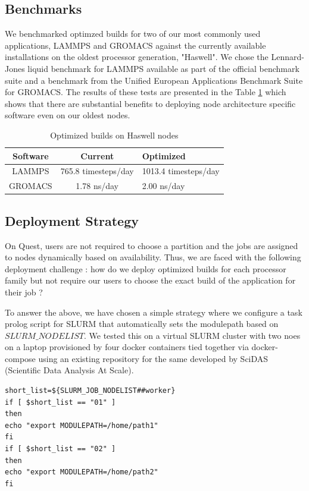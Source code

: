 \documentclass[sigconf,authordraft]{acmart}
\begin{document}
\subsection{Benchmarks}
We benchmarked optimzed builds for two of our most commonly used applications, LAMMPS\cite{lammps} and GROMACS \cite{gromacs_1995,gromacs_2015} against the currently available installations on the oldest processor generation, "Haswell". We chose the Lennard-Jones liquid benchmark for LAMMPS available as part of the official benchmark suite \cite{lammps_bench} and a benchmark from the Unified European Applications Benchmark Suite \cite{ueabs_prace,ueabs_repo} for GROMACS. The results of these tests are presented in the Table \ref{tab:bench_apps} which shows that there are substantial benefits to deploying node architecture specific software even on our oldest nodes.

\begin{table}
	\caption{Optimized builds on Haswell nodes}
	\label{tab:bench_apps}
	\begin{tabular}{ccl}
		\toprule
		Software &Current&Optimized\\
		\midrule
		LAMMPS & 765.8 timesteps/day&1013.4 timesteps/day\\
		GROMACS & 1.78 ns/day&2.00 ns/day\\
		\bottomrule
	\end{tabular}
\end{table}

\subsection{Deployment Strategy}
On Quest, users are not required to choose a partition and the jobs are assigned to nodes dynamically based on availability. Thus, we are faced with the following deployment challenge : how do we deploy optimized builds for each processor family but not require our users to choose the exact build of the application for their job ?

To answer the above, we have chosen a simple strategy where we configure a task prolog script for SLURM that automatically sets the modulepath based on $SLURM\_NODELIST$. We tested this on a virtual SLURM cluster with two noes on a laptop provisioned by four docker containers tied together via docker-compose using an existing repository \cite{slurmdocker_repository} for the same developed by SciDAS (Scientific Data Analysis At Scale).

\begin{verbatim}
short_list=${SLURM_JOB_NODELIST##worker}
if [ $short_list == "01" ]
then
echo "export MODULEPATH=/home/path1"
fi
if [ $short_list == "02" ]
then
echo "export MODULEPATH=/home/path2"
fi
\end{verbatim}
\end{document}
